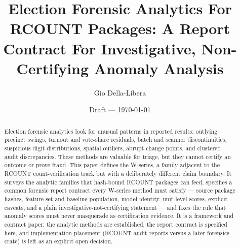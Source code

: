 \documentclass[12pt]{article}
\title{Election Forensic Analytics For RCOUNT Packages:
A Report Contract For Investigative, Non-Certifying Anomaly Analysis}
\author{Gio Della-Libera}
\date{Draft --- \today}
\begin{document}
\maketitle

\begin{abstract}
Election forensic analytics look for unusual patterns in reported results:
outlying precinct swings, turnout and vote-share residuals, batch and scanner
discontinuities, suspicious digit distributions, spatial outliers, abrupt
change points, and clustered audit discrepancies. These methods are valuable
for triage, but they cannot certify an outcome or prove fraud. This paper
defines the W-series, a family adjacent to the RCOUNT count-verification track
but with a deliberately different claim boundary. It surveys the analytic
families that hash-bound RCOUNT packages can feed, specifies a common forensic
report contract every W-series method must satisfy --- source package hashes,
feature set and baseline population, model identity, unit-level scores,
explicit caveats, and a plain investigative-not-certifying statement --- and
fixes the rule that anomaly scores must never masquerade as certification
evidence. It is a framework and contract paper: the analytic methods are
established, the report contract is specified here, and implementation
placement (RCOUNT audit reports versus a later forensics crate) is left as an
explicit open decision.
\end{abstract}








\nocite{rcount-overview-2026,rcount-v7-2026}


\end{document}
